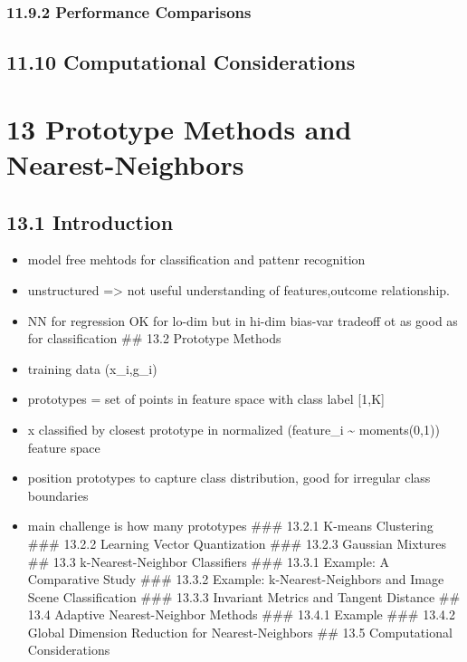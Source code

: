 \documentclass[11pt]{article}
\providecommand{\tightlist}{%
      \setlength{\itemsep}{0pt}\setlength{\parskip}{0pt}}
\begin{document}
\subsubsection{11.9.2 Performance
Comparisons}\label{performance-comparisons}

\subsection{11.10 Computational
Considerations}\label{computational-considerations}

    \section{13 Prototype Methods and
Nearest-Neighbors}\label{prototype-methods-and-nearest-neighbors}

\subsection{13.1 Introduction}\label{introduction}

\begin{itemize}
\tightlist
\item
  model free mehtods for classification and pattenr recognition
\item
  unstructured =\textgreater{} not useful understanding of
  features,outcome relationship.
\item
  NN for regression OK for lo-dim but in hi-dim bias-var tradeoff ot as
  good as for classification \#\# 13.2 Prototype Methods
\item
  training data (x\_i,g\_i)
\item
  prototypes = set of points in feature space with class label {[}1,K{]}
\item
  x classified by closest prototype in normalized (feature\_i
  \textasciitilde{} moments(0,1)) feature space
\item
  position prototypes to capture class distribution, good for irregular
  class boundaries
\item
  main challenge is how many prototypes \#\#\# 13.2.1 K-means Clustering
  \#\#\# 13.2.2 Learning Vector Quantization \#\#\# 13.2.3 Gaussian
  Mixtures \#\# 13.3 k-Nearest-Neighbor Classifiers \#\#\# 13.3.1
  Example: A Comparative Study \#\#\# 13.3.2 Example:
  k-Nearest-Neighbors and Image Scene Classification \#\#\# 13.3.3
  Invariant Metrics and Tangent Distance \#\# 13.4 Adaptive
  Nearest-Neighbor Methods \#\#\# 13.4.1 Example \#\#\# 13.4.2 Global
  Dimension Reduction for Nearest-Neighbors \#\# 13.5 Computational
  Considerations
\end{itemize}
\end{document}
